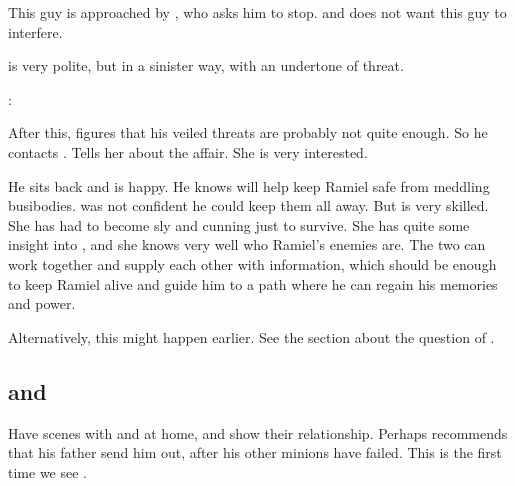 This guy is approached by \Azraid, who asks him to stop. 
\Azraid{}  and does not want this guy to interfere. 

\Azraid{} is very polite, but in a sinister way, with an undertone of threat. 

\begin{prose}
  \Azraid:
\end{prose}

After this, \Azraid{} figures that his veiled threats are probably not quite enough. 
So he contacts \Cishiel. 
Tells her about the affair. 
She is very interested. 

He sits back and is happy.
He knows \Cishiel{} will help keep Ramiel safe from meddling \Mystraacht{} busibodies. 
\Azraid{} was not confident he could keep them all away. 
But \Cishiel{} is very skilled. 
She has had to become sly and cunning just to survive. 
She has quite some insight into \Mystraacht, and she knows very well who Ramiel's enemies are. 
The two can work together and supply each other with information, which should be enough to keep Ramiel alive and guide him to a path where he can regain his memories and power. 

Alternatively, this might happen earlier.
See the section about the question of .









\subsection{\Vizsherioch{} and \Secherdamon}
Have scenes with \Vizsherioch{} and \Secherdamon{} at home, and show their relationship. 
Perhaps \Vizsherioch{} recommends that his father send him out, after his other minions have failed. This is the first time we see \Vizsherioch. 








